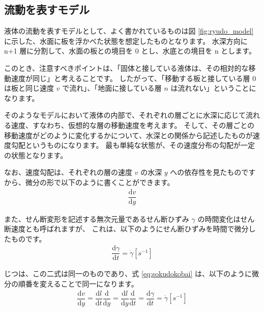 \documentclass[uplatex,dvipdfmx,a4paper,11pt]{jsreport}
\begin{document}
\subsection{流動を表すモデル}

液体の流動を表すモデルとして、よく書かれているものは図 \ref{fig:ryudo_model} に示した、水面に板を浮かべた状態を想定したものとなります。
水深方向に n+1 層に分割して、水面の板との境目を 0 とし、水底との境目を n とします。

このとき、注意すべきポイントは、「固体と接している液体は、その相対的な移動速度が同じ」と考えることです。
したがって、「移動する板と接している層 0 は板と同じ速度 $v$ で流れ」、「地面に接している層 $n$ は流れない」ということになります。

そのようなモデルにおいて液体の内部で、それぞれの層ごとに水深に応じて流れる速度、すなわち、仮想的な層の移動速度を考えます。
そして、その層ごとの移動速度がどのように変化するかについて、水深との関係から記述したものが速度勾配というものになります。
最も単純な状態が、その速度分布の勾配が一定の状態となります。

なお、速度勾配は、それぞれの層の速度 $v$ の水深 $y$ への依存性を見たものですから、微分の形で以下のように書くことができます。
\begin{align}
	\dfrac{\mathrm{d} v}{\mathrm{d} y}
	\label{eq:sokudokobai}
\end{align}

また、せん断変形を記述する無次元量であるせん断ひずみ $\gamma$ の時間変化はせん断速度とも呼ばれますが、
これは、以下のようにせん断ひずみを時間で微分したものです。
\begin{align}
	\dfrac{\mathrm{d} \gamma}{\mathrm{d} t} =\dot{\gamma} [s^{-1}]
\end{align}

じつは、この二式は同一のものであり、式 \eqref{eq:sokudokobai} は、以下のように微分の順番を変えることで同一になります。
\begin{align}
	\dfrac{\mathrm{d} v}{\mathrm{d} y} 
	= \dfrac{\mathrm{d} l}{\mathrm{d} t} \dfrac{\mathrm{d} }{\mathrm{d} y}
	= \dfrac{\mathrm{d} l}{\mathrm{d} y} \dfrac{\mathrm{d} }{\mathrm{d} t}
	= \dfrac{\mathrm{d} \gamma}{\mathrm{d} t} =\dot{\gamma} [s^{-1}]
\end{align}
\end{document}
